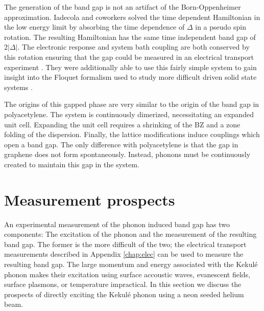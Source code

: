 The generation of the band gap is not an artifact of the Born-Oppenheimer approximation.
Iadecola and coworkers solved the time dependent Hamiltonian in the low energy limit by absorbing the time dependence of $\Delta$ in a pseudo spin rotation.
The resulting Hamiltonian has the same time independent band gap of $2 |\Delta|$.
The electronic response and system bath coupling are both conserved by this rotation ensuring that the gap could be measured in an electrical transport experiment \cite{Iadecola2013}.
They were additionally able to use this fairly simple system to gain insight into the Floquet formalism used to study more difficult driven solid state systems \cite{Iadecola2013a}.

The origins of this gapped phase are very similar to the origin of the band gap in polyacetylene.
The system is continuously dimerized, necessitating an expanded unit cell.
Expanding the unit cell requires a shrinking of the BZ and a zone folding of the dispersion.
Finally, the lattice modifications induce couplings which open a band gap.
The only difference with polyacetylene is that the gap in graphene does not form spontaneously.
Instead, phonons must be continuously created to maintain this gap in the system.

\section{Measurement prospects}
An experimental measurement of the phonon induced band gap has two components: The excitation of the phonon and the measurement of the resulting band gap.
The former is the more difficult of the two; the electrical transport measurements described in Appendix \ref{chap:elec} can be used to measure the resulting band gap.
The large momentum and energy associated with the Kekul\'e phonon makes their excitation using surface accoustic waves, evanescent fields, surface plasmons, or temperature impractical.
In this section we discuss the prospects of directly exciting the Kekul\'e phonon using a neon seeded helium beam.

